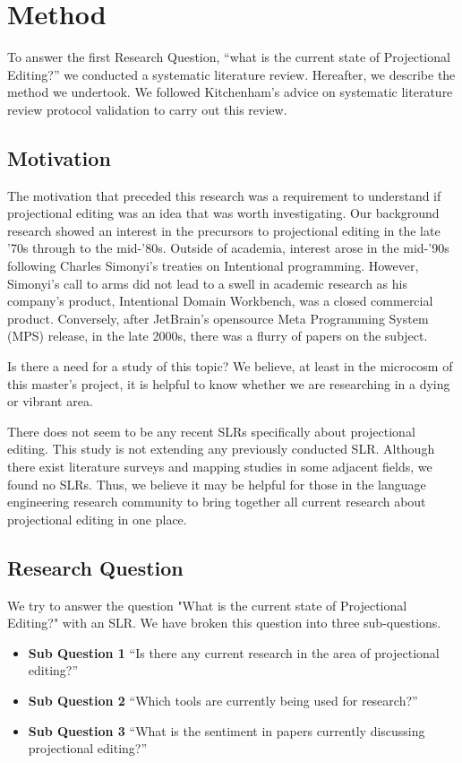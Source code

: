 \section{Method}
\label{section:slr_method}

To answer the first Research Question, ``what is the current state of Projectional Editing?'' we conducted a systematic literature review.
Hereafter, we describe the method we undertook. 
We followed Kitchenham's\cite{kitchenham2015evidence} advice on systematic literature review protocol validation to carry out this review.

\subsection{Motivation}
The motivation that preceded this research was a requirement to understand if projectional editing was an idea that was worth investigating.
Our background research showed an interest in the precursors to projectional editing in the late '70s through to the mid-'80s.
Outside of academia, interest arose in the mid-'90s following Charles Simonyi's treaties on Intentional programming.
However, Simonyi's call to arms did not lead to a swell in academic research as his company's product, Intentional Domain Workbench, was a closed commercial product.
Conversely, after JetBrain's opensource Meta Programming System (MPS) release, in the late 2000s, there was a flurry of papers on the subject.

Is there a need for a study of this topic? 
We believe, at least in the microcosm of this master's project, it is helpful to know whether we are researching in a dying or vibrant area.

There does not seem to be any recent SLRs specifically about projectional editing.
This study is not extending any previously conducted SLR.
Although there exist literature surveys and mapping studies in some adjacent fields, we found no SLRs.
Thus, we believe it may be helpful for those in the language engineering research community to bring together all current research about projectional editing in one place.

\subsection{Research Question}
We try to answer the question "What is the current state of Projectional Editing?" with an SLR. 
We have broken this question into three sub-questions.

\begin{itemize}
    \setlength\itemsep{0em}
    \item \textbf{Sub Question 1} ``Is there any current research in the area of projectional editing?''
    \item \textbf{Sub Question 2} ``Which tools are currently being used for research?''
    \item \textbf{Sub Question 3} ``What is the sentiment in papers currently discussing projectional editing?''
\end{itemize}


